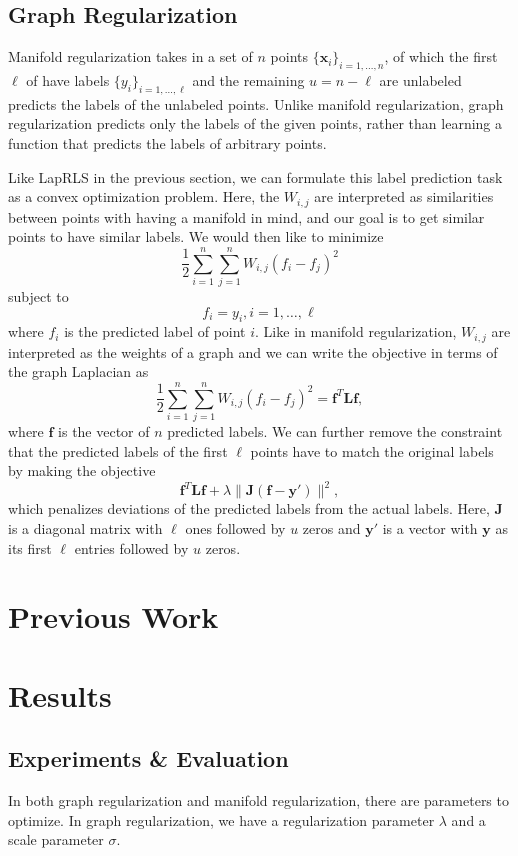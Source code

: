 \documentclass[anon,11pt]{9520} %
\newcommand{\mb}{\mathbf}
\begin{document}
\subsection{Graph Regularization}
Manifold regularization takes in a set of $n$ points $\{\mb x_i\}_{i=1,\dots,n}$, of which the first $\ell$ of have labels $\{y_i\}_{i=1,\dots,\ell}$ and the remaining $u=n-\ell$ are unlabeled predicts the labels of the unlabeled points. Unlike manifold regularization, graph regularization predicts only the labels of the given points, rather than learning a function that predicts the labels of arbitrary points.

Like LapRLS in the previous section, we can formulate this label prediction task as a convex optimization problem. Here, the $W_{i,j}$ are interpreted as similarities between points with having a manifold in mind, and our goal is to get similar points to have similar labels. We would then like to minimize \[\frac{1}{2} \sum_{i=1}^{n} \sum_{j=1}^{n} W_{i,j}(f_i-f_j)^2\] subject to \[f_i=y_i, i=1,\dots,\ell\] where $f_i$ is the predicted label of point $i$. Like in manifold regularization, $W_{i,j}$ are interpreted as the weights of a graph and we can write the objective in terms of the graph Laplacian as \[\frac{1}{2} \sum_{i=1}^{n} \sum_{j=1}^{n} W_{i,j}(f_i-f_j)^2 = \mb{f}^T \mb{L} \mb{f},\] where $\mb{f}$ is the vector of $n$ predicted labels. We can further remove the constraint that the predicted labels of the first $\ell$ points have to match the original labels by making the objective \[\mb{f}^T\mb{L}\mb{f} + \lambda\|\mb{J}(\mb{f}-\mb{y'})\|^2,\] which penalizes deviations of the predicted labels from the actual labels. Here, $\mb{J}$ is a diagonal matrix with $\ell$ ones followed by $u$ zeros and $\mb{y'}$ is a vector with $\mb{y}$ as its first $\ell$ entries followed by $u$ zeros.

\section{Previous Work}

\section{Results}

\subsection{Experiments \& Evaluation}

In both graph regularization and manifold regularization, there are parameters to optimize. In graph regularization, we have a regularization parameter $\lambda$ and a scale parameter $\sigma$.
\end{document}
